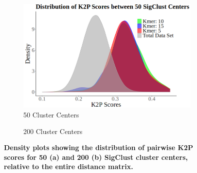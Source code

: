 \documentclass[12pt]{article}
\begin{document}
  \begin{figure}[H]
    \centering
    \begin{subfigure}{0.5\textwidth}
        \includegraphics[width=\linewidth]{sigClust_50.png}
        \caption{50 Cluster Centers}
    \end{subfigure}%
    \hspace{-0.2cm} 
    \begin{subfigure}{0.5\textwidth}
        \caption{200 Cluster Centers}
    \end{subfigure}
    \captionsetup{margin=0.75cm}
      \caption{\textbf{\small Density plots showing the distribution of pairwise K2P scores for 50 (a) and 200 (b) SigClust cluster centers, relative to the entire distance matrix.}}
  \end{figure}
\end{document}
